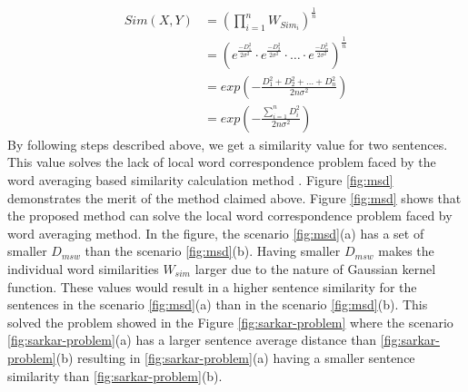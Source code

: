 \documentclass[acmlarge]{acmart}
\begin{document}
\begin{equation}\label{eq:sent_sim}
	\begin{split}
		Sim(X,Y)
		&=  \left(
		\prod_{i=1}^nW_{Sim_i}
		\right)^{\frac{1}{n}}\\
		&=  \left(
		e^{\frac{-D_1^2}{2\sigma^2}}\cdot
		e^{\frac{-D_2^2}{2\sigma^2}}\cdot
		\ldots \cdot
		e^{\frac{-D_n^2}{2\sigma^2}}
		\right)^\frac{1}{n}\\
		&=  exp\left(
		-\frac{D_1^2+D_2^2+\ldots+D_n^2}{2n\sigma^2}
		\right)\\
		&=  exp\left(
		-\frac{\sum_{i=1}^nD_i^2}{2n\sigma^2}
		\right)
	\end{split}
\end{equation}
By following steps described above, we get a similarity value for two sentences. This value solves the lack of local word correspondence problem faced by the word averaging based similarity calculation method \cite{roychowdhury-etal-2022-spectral-base}. Figure \ref{fig:msd} demonstrates the merit of the method claimed above. Figure \ref{fig:msd} 
shows that the proposed method can solve the local word correspondence problem faced by word averaging method. In the figure, the scenario \ref{fig:msd}(a) has a set of smaller $D_{msw}$ than the scenario \ref{fig:msd}(b). Having smaller $D_{msw}$ makes the individual word similarities $W_{sim}$ larger due to the nature of Gaussian kernel function. These values would result in a higher sentence similarity for the sentences in the scenario \ref{fig:msd}(a) than in the scenario \ref{fig:msd}(b). This solved the problem showed in the Figure \ref{fig:sarkar-problem} where the scenario \ref{fig:sarkar-problem}(a) has a larger sentence average distance than \ref{fig:sarkar-problem}(b) resulting in \ref{fig:sarkar-problem}(a) having a smaller sentence similarity than \ref{fig:sarkar-problem}(b).\\
\end{document}
